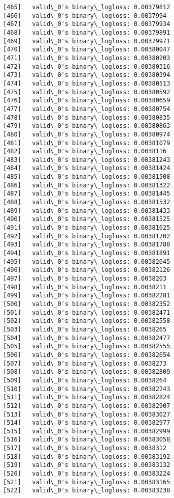 \documentclass[11pt]{article}
\begin{document}
\begin{Verbatim}[commandchars=\\\{\}]
[465]	valid\_0's binary\_logloss: 0.00379812
[466]	valid\_0's binary\_logloss: 0.0037994
[467]	valid\_0's binary\_logloss: 0.00379934
[468]	valid\_0's binary\_logloss: 0.00379891
[469]	valid\_0's binary\_logloss: 0.00379971
[470]	valid\_0's binary\_logloss: 0.00380047
[471]	valid\_0's binary\_logloss: 0.00380203
[472]	valid\_0's binary\_logloss: 0.00380316
[473]	valid\_0's binary\_logloss: 0.00380394
[474]	valid\_0's binary\_logloss: 0.00380513
[475]	valid\_0's binary\_logloss: 0.00380592
[476]	valid\_0's binary\_logloss: 0.00380659
[477]	valid\_0's binary\_logloss: 0.00380754
[478]	valid\_0's binary\_logloss: 0.00380835
[479]	valid\_0's binary\_logloss: 0.00380863
[480]	valid\_0's binary\_logloss: 0.00380974
[481]	valid\_0's binary\_logloss: 0.00381079
[482]	valid\_0's binary\_logloss: 0.0038116
[483]	valid\_0's binary\_logloss: 0.00381243
[484]	valid\_0's binary\_logloss: 0.00381424
[485]	valid\_0's binary\_logloss: 0.00381508
[486]	valid\_0's binary\_logloss: 0.00381322
[487]	valid\_0's binary\_logloss: 0.00381445
[488]	valid\_0's binary\_logloss: 0.00381532
[489]	valid\_0's binary\_logloss: 0.00381433
[490]	valid\_0's binary\_logloss: 0.00381525
[491]	valid\_0's binary\_logloss: 0.00381625
[492]	valid\_0's binary\_logloss: 0.00381702
[493]	valid\_0's binary\_logloss: 0.00381788
[494]	valid\_0's binary\_logloss: 0.00381891
[495]	valid\_0's binary\_logloss: 0.00382045
[496]	valid\_0's binary\_logloss: 0.00382126
[497]	valid\_0's binary\_logloss: 0.0038203
[498]	valid\_0's binary\_logloss: 0.0038211
[499]	valid\_0's binary\_logloss: 0.00382281
[500]	valid\_0's binary\_logloss: 0.00382352
[501]	valid\_0's binary\_logloss: 0.00382471
[502]	valid\_0's binary\_logloss: 0.00382558
[503]	valid\_0's binary\_logloss: 0.0038265
[504]	valid\_0's binary\_logloss: 0.00382477
[505]	valid\_0's binary\_logloss: 0.00382555
[506]	valid\_0's binary\_logloss: 0.00382654
[507]	valid\_0's binary\_logloss: 0.0038273
[508]	valid\_0's binary\_logloss: 0.00382809
[509]	valid\_0's binary\_logloss: 0.0038264
[510]	valid\_0's binary\_logloss: 0.00382743
[511]	valid\_0's binary\_logloss: 0.00382824
[512]	valid\_0's binary\_logloss: 0.00382907
[513]	valid\_0's binary\_logloss: 0.00383027
[514]	valid\_0's binary\_logloss: 0.00382977
[515]	valid\_0's binary\_logloss: 0.00382999
[516]	valid\_0's binary\_logloss: 0.00383058
[517]	valid\_0's binary\_logloss: 0.0038312
[518]	valid\_0's binary\_logloss: 0.00383192
[519]	valid\_0's binary\_logloss: 0.00383132
[520]	valid\_0's binary\_logloss: 0.00383224
[521]	valid\_0's binary\_logloss: 0.00383165
[522]	valid\_0's binary\_logloss: 0.00383238

\end{Verbatim}
\end{document}
